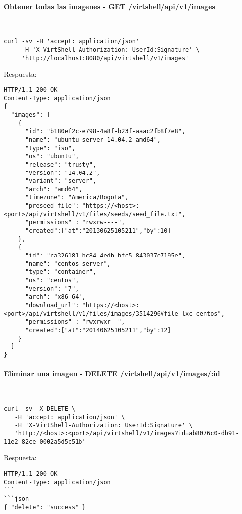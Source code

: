 \paragraph{Obtener todas las imagenes - GET /virtshell/api/v1/images} ~\\

\begin{lstlisting}[style=json]
curl -sv -H 'accept: application/json' 
     -H 'X-VirtShell-Authorization: UserId:Signature' \ 
     'http://localhost:8080/api/virtshell/v1/images'
\end{lstlisting}

\vspace{1cm}
Respuesta:
\vspace{1cm}

\begin{lstlisting}[style=json]
HTTP/1.1 200 OK
Content-Type: application/json
{
  "images": [
    {
      "id": "b180ef2c-e798-4a8f-b23f-aaac2fb8f7e8",
      "name": "ubuntu_server_14.04.2_amd64",
      "type": "iso",
      "os": "ubuntu", 
      "release": "trusty",
      "version": "14.04.2", 
      "variant": "server", 
      "arch": "amd64", 
      "timezone": "America/Bogota", 
      "preseed_file": "https://<host>:<port>/api/virtshell/v1/files/seeds/seed_file.txt",
      "permissions" : "rwxrw----",
      "created":["at":"20130625105211","by":10]
    },
    {
      "id": "ca326181-bc84-4edb-bfc5-843037e7195e",
      "name": "centos_server",
      "type": "container",
      "os": "centos", 
      "version": "7", 
      "arch": "x86_64", 
      "download_url": "https://<host>:<port>/api/virtshell/v1/files/images/3514296#file-lxc-centos",
      "permissions" : "rwxrwxr--",
      "created":["at":"20140625105211","by":12]
    }
  ]
}  
\end{lstlisting}

\paragraph{Eliminar una imagen - DELETE /virtshell/api/v1/images/:id} ~\\

\begin{lstlisting}[style=json]
curl -sv -X DELETE \
   -H 'accept: application/json' \
   -H 'X-VirtShell-Authorization: UserId:Signature' \
   'http://<host>:<port>/api/virtshell/v1/images?id=ab8076c0-db91-11e2-82ce-0002a5d5c51b'
\end{lstlisting}

\vspace{1cm}
Respuesta:
\vspace{1cm}

\begin{lstlisting}[style=json]
HTTP/1.1 200 OK
Content-Type: application/json
```
```json
{ "delete": "success" }
\end{lstlisting}
